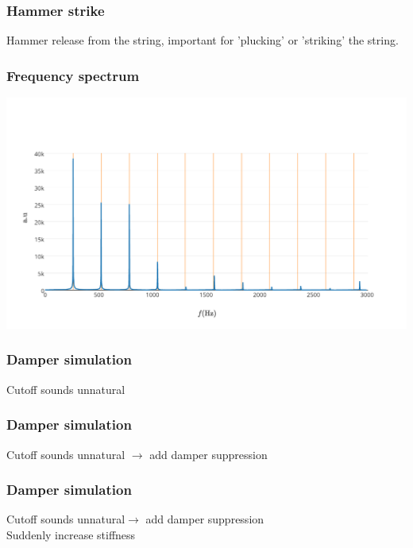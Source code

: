 \documentclass{beamer}
\begin{document}
\begin{frame}\frametitle{Hammer strike}
Hammer release from the string, important for 'plucking' or 'striking' the string.
\end{frame}


\begin{frame}\frametitle{Frequency spectrum}
\begin{minipage}{1\textwidth}
		\includegraphics[width=\textwidth]{images/freq.pdf}
	\end{minipage}
\end{frame}

\begin{frame}\frametitle{Damper simulation}
Cutoff sounds unnatural
\end{frame}

\begin{frame}\frametitle{Damper simulation}
Cutoff sounds unnatural $\rightarrow$ add damper suppression
\end{frame}

\begin{frame}\frametitle{Damper simulation}
Cutoff sounds unnatural$\rightarrow$ add damper suppression\\
Suddenly increase stiffness
\end{frame}
\end{document}
